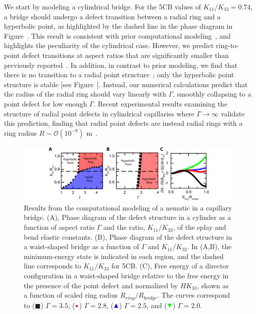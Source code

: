 We start by modeling a cylindrical bridge.
For the 5CB values of $K_{11}/K_{33} = 0.74$, a bridge should undergo a defect transition between a radial ring and a hyperbolic point, as highlighted by the dashed line in the phase diagram in Figure~.
This result is consistent with prior computational modeling~\cite{RN144}, and highlights the peculiarity of the cylindrical case.
However, we predict ring-to-point defect transitions at aspect ratios that are significantly smaller than previously reported~\cite{RN144}.
In addition, in contrast to prior modeling, we find that there is no transition to a radial point structure~\cite{RN144}; only the hyperbolic point structure is stable [see Figure~].
Instead, our numerical calculations predict that the radius of the radial ring should vary linearly with $\Gamma$, smoothly collapsing to a point defect for low enough $\Gamma$.
Recent experimental results examining the structure of radial point defects in cylindrical capillaries where $\Gamma \rightarrow \infty$ validate this prediction, finding that radial point defects are instead radial rings with a ring radius $R \sim \mathcal{O}(10^{-8})$ m~\cite{RN280}.
\begin{figure}
  \centering
  \includegraphics{figures/C5/Ch5-Figs_Calcs.png}
  \caption{Results from the computational modeling of a nematic in a capillary bridge.
  (A), Phase diagram of the defect structure in a cylinder as a function of aspect ratio $\Gamma$ and the ratio, $K_{11}/K_{33}$, of the splay and bend elastic constants.
  (B), Phase diagram of the defect structure in a waist-shaped bridge as a function of $\Gamma$ and $K_{11}/K_{33}$.
  In (A,B), the minimum-energy state is indicated in each region, and the dashed line corresponds to $K_{11} / K_{33}$ for 5CB.\@
  (C), Free energy of a director configuration in a waist-shaped bridge relative to the free energy in the presence of the point defect and normalized by $H K_{33}$, shown as a function of scaled ring radius $R_{ring}/R_{bridge}$.
  The curves correspond to (${\blacksquare}$) $\Gamma = 3.5$, (${\color{red} \bullet}$) $\Gamma = 2.8$, (${\color{blue} \blacktriangle}$) $\Gamma = 2.5$, and (${\color{green} \blacktriangledown}$) $\Gamma = 2.0$.}\label{f:5-Calcs}
\end{figure}

